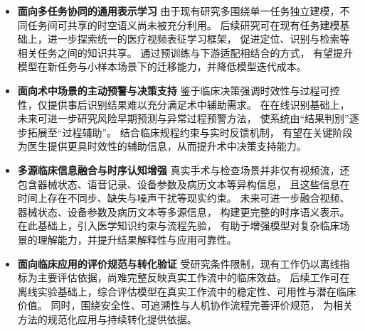 \begin{itemize}
    \item \textbf{面向多任务协同的通用表示学习}\quad
    由于现有研究多围绕单一任务独立建模，不同任务间可共享的时空语义尚未被充分利用。
    后续研究可在现有任务建模基础上，进一步探索统一的医疗视频表征学习框架，
    促进定位、识别与检索等相关任务之间的知识共享。
    通过预训练与下游适配相结合的方式，
    有望提升模型在新任务与小样本场景下的迁移能力，并降低模型迭代成本。

    \item \textbf{面向术中场景的主动预警与决策支持}\quad
    鉴于临床决策强调时效性与过程可控性，仅提供事后识别结果难以充分满足术中辅助需求。
    在在线识别基础上，未来可进一步研究风险早期预测与异常过程预警方法，
    使系统由“结果判别”逐步拓展至“过程辅助”。
    结合临床规程约束与实时反馈机制，
    有望在关键阶段为医生提供更具时效性的辅助信息，从而提升术中决策支持能力。

    \item \textbf{多源临床信息融合与时序认知增强}\quad
    真实手术与检查场景并非仅有视频流，还包含器械状态、语音记录、设备参数及病历文本等异构信息，
    且这些信息在时间上存在不同步、缺失与噪声干扰等现实约束。
    未来可进一步融合视频、器械状态、设备参数及病历文本等多源信息，
    构建更完整的时序语义表示。
    在此基础上，引入医学知识约束与流程先验，
    有助于增强模型对复杂临床场景的理解能力，并提升结果解释性与应用可靠性。

    \item \textbf{面向临床应用的评价规范与转化验证}\quad
    受研究条件限制，现有工作仍以离线指标为主要评估依据，尚难完整反映真实工作流中的临床效益。
    后续工作可在离线实验基础上，综合评估模型在真实工作流中的稳定性、可用性与潜在临床价值。
    同时，围绕安全性、可追溯性与人机协作流程完善评价规范，
    为相关方法的规范化应用与持续转化提供依据。
\end{itemize}   